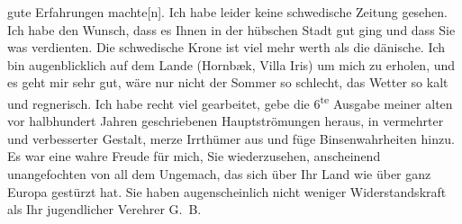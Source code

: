 \begin{ledgroupsized}[t]{13cm}
               gute Erfahrungen machte{[}n{]}. Ich habe leider keine schwedische Zeitung gesehen. Ich habe den
               Wunsch, dass es Ihnen in der hübschen Stadt gut ging und dass Sie was verdienten. Die schwedische Krone ist viel mehr werth als die
                  dänische.\pend
           \pstart
           Ich bin augenblicklich auf dem Lande (Hornbæk,
                  Villa Iris) um mich zu erholen, und es geht
               mir sehr gut, wäre nur nicht der Sommer so schlecht, das Wetter so kalt und
               regnerisch. Ich habe recht viel gearbeitet, gebe die 6\textsuperscript{te}
               Ausgabe meiner alten vor halbhundert Jahren geschriebenen Hauptströmungen heraus, in vermehrter und verbesserter Gestalt,
               merze {\pb}Irrthümer aus und füge
               Binsenwahrheiten hinzu.\pend
           \pstart
           Es war eine wahre Freude für mich, Sie wiederzusehen, anscheinend unangefochten von
               all dem Ungemach, das sich über Ihr Land wie über ganz Europa gestürzt hat. Sie haben augenscheinlich nicht weniger
               Widerstandskraft als Ihr jugendlicher Verehrer\pend
           \pstart \spacefill\mbox{G. B.}\pend{}\pstart
           \noindent{}\label{T_L02401-1v}\label{T_L02401-1h}\pend
           
         
         \endnumbering{}\end{ledgroupsized}  \newcommand{\dateiname}{L02401}\newcommand{\titel}{Georg Brandes an Arthur Schnitzler, 11. 6. 1923}\newcommand{\editorInnen}{Martin Anton Müller und Gerd-Hermann Susen}
      